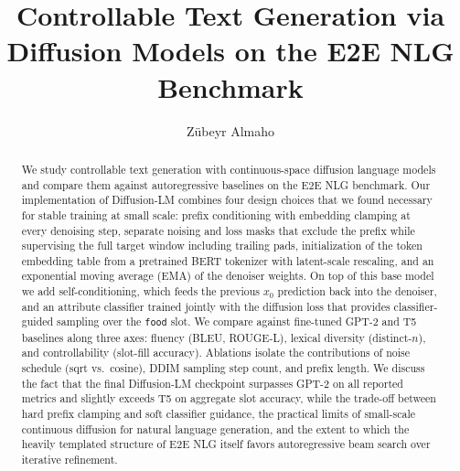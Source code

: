 \documentclass{llncs}
\begin{document}
\title{Controllable Text Generation via Diffusion Models on the E2E NLG Benchmark}

\author{Zübeyr Almaho}

\maketitle

\begin{abstract}
We study controllable text generation with continuous-space diffusion language
models and compare them against autoregressive baselines on the E2E NLG
benchmark. Our implementation of Diffusion-LM combines four design choices
that we found necessary for stable training at small scale: prefix
conditioning with embedding clamping at every denoising step, separate
noising and loss masks that exclude the prefix while supervising the full
target window including trailing pads, initialization of the token embedding
table from a pretrained BERT tokenizer with latent-scale rescaling, and an
exponential moving average (EMA) of the denoiser weights. On top of this base model we add
self-conditioning, which feeds the previous $x_0$ prediction back into the
denoiser, and an attribute classifier trained jointly with the diffusion loss
that provides classifier-guided sampling over the \texttt{food} slot. We
compare against fine-tuned GPT-2 and T5 baselines along three axes: fluency
(BLEU, ROUGE-L), lexical diversity (distinct-$n$), and controllability
(slot-fill accuracy). Ablations isolate the contributions of noise schedule
(sqrt vs.\ cosine), DDIM sampling step count, and prefix length. We discuss
the fact that the final Diffusion-LM checkpoint surpasses GPT-2 on all
reported metrics and slightly exceeds T5 on aggregate slot accuracy, while
the trade-off between hard prefix clamping and soft classifier guidance, the
practical limits of small-scale continuous diffusion for natural language
generation, and the extent to which the heavily templated structure of
E2E NLG itself favors autoregressive beam search over iterative
refinement.

\end{abstract}
\end{document}
